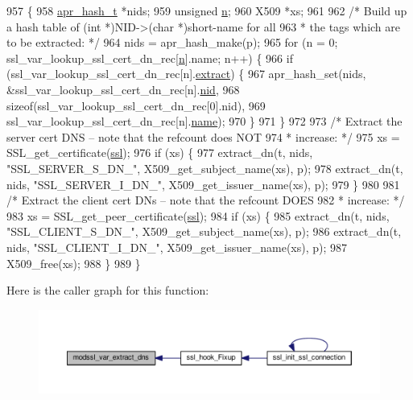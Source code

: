 \begin{DoxyCode}
957 \{
958     \hyperlink{structapr__hash__t}{apr\_hash\_t} *nids;
959     \textcolor{keywordtype}{unsigned} \hyperlink{group__APACHE__CORE__PROTO_gad484edfd58b9127caa8f0f59b4004d09}{n};
960     X509 *xs;
961 
962     \textcolor{comment}{/* Build up a hash table of (int *)NID->(char *)short-name for all}
963 \textcolor{comment}{     * the tags which are to be extracted: */}
964     nids = apr\_hash\_make(p);
965     \textcolor{keywordflow}{for} (n = 0; ssl\_var\_lookup\_ssl\_cert\_dn\_rec[\hyperlink{group__APACHE__CORE__PROTO_gad484edfd58b9127caa8f0f59b4004d09}{n}].name; n++) \{
966         \textcolor{keywordflow}{if} (ssl\_var\_lookup\_ssl\_cert\_dn\_rec[n].\hyperlink{ssl__engine__vars_8c_a043933ab76daa27c96ff25d1cd20b6d8}{extract}) \{
967             apr\_hash\_set(nids, &ssl\_var\_lookup\_ssl\_cert\_dn\_rec[n].\hyperlink{ssl__engine__vars_8c_a7235ef62e89328f5155846dc59c6fc37}{nid},
968                          \textcolor{keyword}{sizeof}(ssl\_var\_lookup\_ssl\_cert\_dn\_rec[0].nid),
969                          ssl\_var\_lookup\_ssl\_cert\_dn\_rec[n].\hyperlink{ssl__engine__vars_8c_a5ac083a645d964373f022d03df4849c8}{name});
970         \}
971     \}
972 
973     \textcolor{comment}{/* Extract the server cert DNS -- note that the refcount does NOT}
974 \textcolor{comment}{     * increase: */}
975     xs = SSL\_get\_certificate(\hyperlink{group__MOD__SSL_ga91d808d6c1c01029f9c9260b9b69a437}{ssl});
976     \textcolor{keywordflow}{if} (xs) \{
977         extract\_dn(t, nids, \textcolor{stringliteral}{"SSL\_SERVER\_S\_DN\_"}, X509\_get\_subject\_name(xs), p);
978         extract\_dn(t, nids, \textcolor{stringliteral}{"SSL\_SERVER\_I\_DN\_"}, X509\_get\_issuer\_name(xs), p);
979     \}
980 
981     \textcolor{comment}{/* Extract the client cert DNs -- note that the refcount DOES}
982 \textcolor{comment}{     * increase: */}
983     xs = SSL\_get\_peer\_certificate(\hyperlink{group__MOD__SSL_ga91d808d6c1c01029f9c9260b9b69a437}{ssl});
984     \textcolor{keywordflow}{if} (xs) \{
985         extract\_dn(t, nids, \textcolor{stringliteral}{"SSL\_CLIENT\_S\_DN\_"}, X509\_get\_subject\_name(xs), p);
986         extract\_dn(t, nids, \textcolor{stringliteral}{"SSL\_CLIENT\_I\_DN\_"}, X509\_get\_issuer\_name(xs), p);
987         X509\_free(xs);
988     \}
989 \}
\end{DoxyCode}


Here is the caller graph for this function\+:
\nopagebreak
\begin{figure}[H]
\begin{center}
\leavevmode
\includegraphics[width=350pt]{group__MOD__SSL__PRIVATE_gadbed069aea3f28bc8aa6dd97e15cd743_icgraph}
\end{center}
\end{figure}


